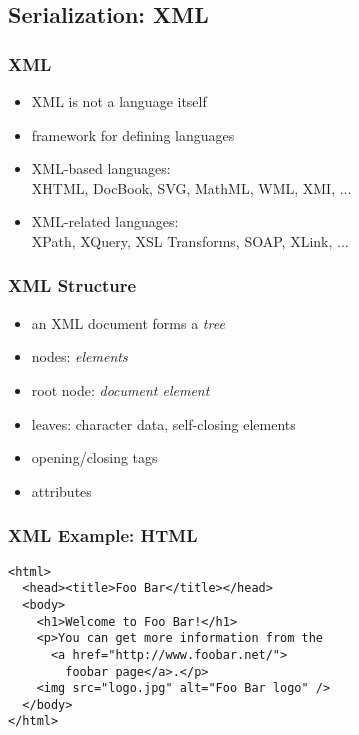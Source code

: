 \documentclass[dvipsnames]{beamer}
\theoremstyle{plain}
\begin{document}
\subsection{Serialization: XML}

\lstset{language=XML}

\begin{frame}
  \frametitle{XML}

  \begin{itemize}
    \item XML is not a language itself
    \item framework for defining languages

    \medskip
    \item XML-based languages:\\
      XHTML, DocBook, SVG, MathML, WML, XMI, ...

    \smallskip
    \item XML-related languages:\\
      XPath, XQuery, XSL Transforms, SOAP, XLink, ...
  \end{itemize}
\end{frame}

\begin{frame}
  \frametitle{XML Structure}

  \begin{itemize}
    \item an XML document forms a \emph{tree}

    \item nodes: \emph{elements}
    \item root node: \emph{document element}
    \item leaves: character data, self-closing elements

    \pause
    \medskip
    \item opening/closing tags
    \item attributes
  \end{itemize}
\end{frame}

\begin{frame}[fragile]
  \frametitle{XML Example: HTML}

  \begin{lstlisting}
<html>
  <head><title>Foo Bar</title></head>
  <body>
    <h1>Welcome to Foo Bar!</h1>
    <p>You can get more information from the
      <a href="http://www.foobar.net/">
        foobar page</a>.</p>
    <img src="logo.jpg" alt="Foo Bar logo" />
  </body>
</html>
  \end{lstlisting}
\end{frame}
\end{document}
